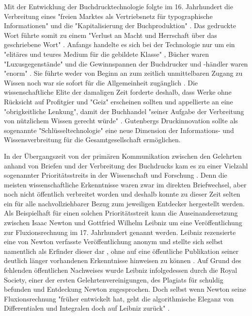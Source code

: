 Mit der Entwicklung der Buchdrucktechnologie folgte im 16. Jahrhundert die Verbreitung eines "freien Marktes als Vertriebsnetz für typographische Informationen"\cite{giesecke_1991_buchdruck} und die "Kapitalisierung der Buchproduktion" \cite{steiner_1998_autorenhonorar}. Das gedruckte Wort führte somit zu einem "Verlust an Macht und Herrschaft über das geschriebene Wort" \cite{wunderlich_2008_buchdruck}. Anfangs handelte es sich bei der Technologie nur um ein "elitäres und teures Medium für die gebildete Klasse" \cite{hartmann_2008_medien}, Bücher waren "Luxusgegenstände" und die Gewinnspannen der Buchdrucker und -händler waren "enorm" \cite{stober_2014_pressegeschichte}. Sie führte weder von Beginn an zum zeitlich unmittelbaren Zugang zu Wissen noch war sie sofort für die Allgemeinheit zugänglich \cite{hartmann_2008_medien}. Die wissenschaftliche Elite der damaligen Zeit forderte deshalb, dass Werke ohne Rücksicht auf Profitgier und "Geiz" \cite{luther_1876} erscheinen sollten und appellierte an eine "obrigkeitliche Lenkung", damit der Buchhandel "seiner Aufgabe der Verbreitung von nützlichem Wissen gerecht würde" \cite{wittmann_1999_geschichte}. Gutenbergs Druckinnovation sollte als sogenannte "Schlüsseltechnologie" \cite{jager_1993_theoretische} eine neue Dimension der Informations- und Wissensverbreitung für die Gesamtgesellschaft ermöglichen.

In der Übergangszeit von der primären Kommunikation zwischen den Gelehrten anhand von Briefen und der Verbreitung des Buchdrucks kam es zu einer Vielzahl sogenannter Prioritätsstreits in der Wissenschaft und Forschung \cite{schirmbacher_2009_wisspub}. Denn die meisten wissenschaftliche Erkenntnisse waren zwar im direkten Briefwechsel, aber noch nicht öffentlich verbreitet worden und deshalb konnte zu dieser Zeit selten ein für alle nachvollziehbarer Bezug zum jeweiligen Entdecker hergestellt werden. Als Beispielhaft für einen solchen Prioritätsstreit kann die Auseinandersetzung zwischen Isaac Newton und Gottfried Wilhelm Leibniz um eine Veröffentlichung zur Fluxionsrechnung im 17. Jahrhundert genannt werden. Leibniz rezensierte eine von Newton verfasste Veröffentlichung anonym und stellte sich selbst namentlich als Erfinder dieser dar \cite{2013_leibniz}, ohne auf eine öffentliche Publikation seiner deutlich länger vorhandenen Erkenntnisse hinweisen zu können \cite{schirmbacher_2009_wisspub}. Auf Grund des fehlenden öffentlichen Nachweises wurde Leibniz infolgedessen durch die Royal Society, einer der ersten Gelehrtenvereinigungen, des Plagiats für schuldig befunden und Entdeckung Newton zugesprochen. Doch selbst wenn Newton seine Fluxionsrechnung "früher entwickelt hat, geht die algorithmische Eleganz von Differentialen und Integralen doch auf Leibniz zurück" \cite{kittler_faz_1996}.

